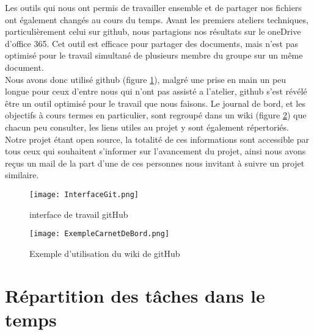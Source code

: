 Les outils qui nous ont permis de travailler ensemble et de partager nos fichiers ont également changés au cours du temps. 
Avant les premiers ateliers techniques, particulièrement celui sur github, nous partagions nos résultats sur le oneDrive d'office 365. Cet outil est efficace pour partager des documents, mais n'est pas optimisé pour le travail simultané de plusieurs membre du groupe sur un même document. \\
Nous avons donc utilisé github (figure \ref{fig:InterfaceGit}), malgré une prise en main un peu longue pour ceux d'entre nous qui n'ont pas assisté a l'atelier, github s'est révélé être un outil optimisé pour le travail que nous faisons. Le journal de bord, et les objectifs à cours termes en particulier, sont regroupé dans un wiki (figure \ref{fig:ExempleWiki}) que chacun peu consulter, les liens utiles au projet y sont également répertoriés. Notre projet étant open source, la totalité de ces informations sont accessible par tous ceux qui souhaitent s'informer sur l'avancement du projet, ainsi nous avons reçus un mail de la part d'une de ces personnes nous invitant à suivre un projet similaire.


\begin{figure}[h!]
\centering\texttt{[image: InterfaceGit.png]}
\caption{\label{fig:InterfaceGit} interface de travail gitHub}
\end{figure}

\begin{figure}[h!]
\centering\texttt{[image: ExempleCarnetDeBord.png]}
\caption{\label{fig:ExempleWiki} Exemple d'utilisation du wiki de gitHub}
\end{figure}

\chapter{Répartition des tâches dans le temps}


